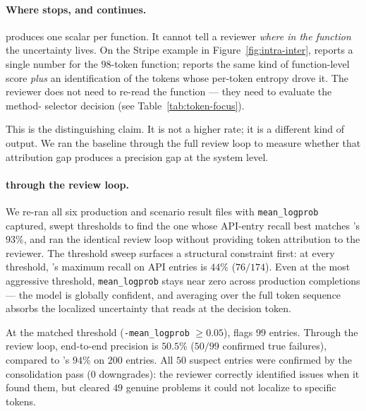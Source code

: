 \paragraph{Where \papg stops, and \eps continues.}
\papg produces one scalar per function. It cannot tell a reviewer
\emph{where in the function} the uncertainty lives. On the Stripe
example in Figure~\ref{fig:intra-inter}, \papg reports a single
number for the $98$-token function; \eps reports the same kind of
function-level score \emph{plus} an identification of the tokens
whose per-token entropy drove it. The reviewer does not need
to re-read the function --- they need to evaluate the method-%
selector decision (see Table~\ref{tab:token-focus}).

This is the distinguishing claim. It is not a higher rate; it is a
different kind of output. We ran the \papg baseline through the full
review loop to measure whether that attribution gap produces a
precision gap at the system level.

\paragraph{\papg through the review loop.}
We re-ran all six production and scenario result files with
\texttt{mean\_logprob} captured, swept \papg thresholds to find the
one whose API-entry recall best matches \eps's $93\%$, and ran the
identical review loop without providing token attribution to the reviewer.
The threshold sweep surfaces a structural constraint first: at every
threshold, \papg's maximum recall on API entries is $44\%$ ($76/174$).
Even at the most aggressive threshold, \texttt{mean\_logprob} stays
near zero across production completions --- the model is globally
confident, and averaging over the full token sequence absorbs the
localized uncertainty that \eps reads at the decision token.

At the matched threshold (\texttt{-mean\_logprob} $\ge 0.05$),
\papg flags $99$ entries. Through the review loop, end-to-end
precision is $50.5\%$ ($50/99$ confirmed true failures), compared
to \eps's $94\%$ on $200$ entries. All $50$ suspect entries were
confirmed by the consolidation pass ($0$ downgrades): the reviewer
correctly identified issues when it found them, but cleared $49$
genuine problems it could not localize to specific tokens.

